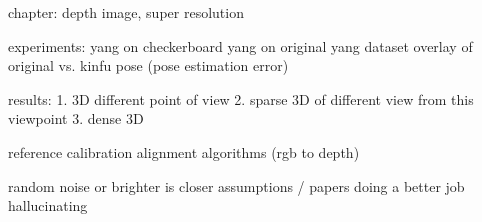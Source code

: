chapter: depth image, super resolution 


experiments:
    yang on checkerboard
    yang on original yang dataset
    overlay of original vs. kinfu pose (pose estimation error)
    
    
results:
1. 3D different point of view
2. sparse 3D of different view from this viewpoint
3. dense 3D

    
reference calibration alignment algorithms (rgb to depth)

random noise or brighter is closer assumptions / papers doing a better job hallucinating